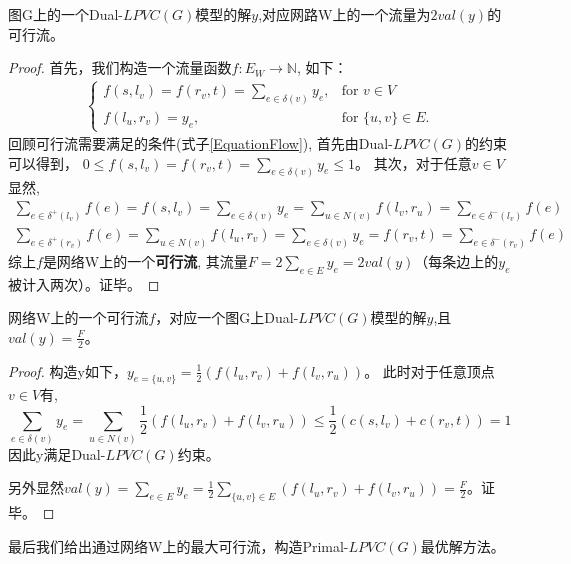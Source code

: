 \begin{property}
图G上的一个Dual-$LPVC(G)$模型的解$y$,对应网路W上的一个流量为$2val(y)$的可行流。
\end{property}
\begin{proof}
  首先，我们构造一个流量函数$f:E_W \rightarrow \mathbb{N}$, 如下：
  \begin{equation*}\begin{aligned} \begin{cases}
    f(s, l_v) = f(r_v, t) = \sum\limits_{e \in \delta(v)}{y_e}, & \mbox{for } v \in V \\
    f(l_u, r_v) = y_e, & \mbox{for } \{u, v\} \in E.
  \end{cases}\end{aligned}\end{equation*}
  回顾可行流需要满足的条件(式子\ref{EquationFlow}), 首先由Dual-$LPVC(G)$的约束可以得到，
  $0 \le f(s, l_v) = f(r_v, t) = \sum\limits_{e \in \delta(v)}{y_e} \le 1$。
  其次，对于任意$v \in V$ 显然,
  \[ \begin{aligned}
     \sum_{e\in \delta^+(l_v)}{f(e)} = f(s, l_v) = \sum\limits_{e \in \delta(v)}{y_e} = \sum_{u \in N(v)}{f(l_v, r_u)} = \sum_{e\in \delta^-(l_v)}{f(e)} \\
    \sum_{e\in \delta^+(r_v)}{f(e)} = \sum_{u \in N(v)}{f(l_u, r_v)}  = \sum\limits_{e \in \delta(v)}{y_e} = f(r_v, t) = \sum_{e\in \delta^-(r_v)}{f(e)}
  \end{aligned} \]
  综上$f$是网络W上的一个\textbf{可行流}, 其流量$F = 2\sum_{e \in E}{y_e} = 2val(y)$（每条边上的$y_e$被计入两次）。证毕。
\end{proof}

\begin{property}
网络W上的一个可行流$f$，对应一个图G上Dual-$LPVC(G)$模型的解$y$,且$val(y) = \frac{F}{2}$。
\end{property}
\begin{proof}
构造y如下，$y_{e = \{u, v\}} = \frac{1}{2}(f(l_u, r_v) + f(l_v, r_u))$。
此时对于任意顶点$v \in V$有,
\[\sum\limits_{e \in \delta(v)}{y_e} = \sum\limits_{u \in N(v)}{\frac{1}{2}(f(l_u, r_v) + f(l_v, r_u))} \le \frac{1}{2}(c(s, l_v) + c(r_v, t)) = 1\]
因此y满足Dual-$LPVC(G)$约束。

另外显然$val(y) = \sum_{e \in E}{y_e} = \frac{1}{2}\sum\limits_{\{u, v\}\in E}{(f(l_u, r_v) + f(l_v, r_u))} = \frac{F}{2}$。证毕。
\end{proof}

最后我们给出通过网络W上的最大可行流，构造Primal-$LPVC(G)$最优解方法。

